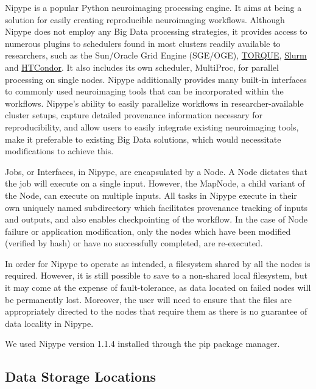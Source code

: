 \documentclass{IEEEtran}
\begin{document}
Nipype is a popular Python neuroimaging processing engine. It aims at being a 
solution for easily creating reproducible neuroimaging workflows. Although Nipype
does not employ any Big Data processing strategies, it provides access to numerous
plugins to schedulers found in most clusters readily available to researchers, 
such as the Sun/Oracle Grid Engine (SGE/OGE), \href{http://www.adaptivecomputing.com/products/torque/}{TORQUE},
\href{https://slurm.schedmd.com/}{Slurm} and \href{https://research.cs.wisc.edu/htcondor/}{HTCondor}. It also includes its own scheduler, MultiProc,
for parallel processing on single nodes. Nipype additionally provides many built-in 
interfaces to commonly used neuroimaging tools that can be incorporated within the 
workflows. Nipype's ability to easily parallelize workflows in researcher-available 
cluster setups, capture detailed provenance information necessary for reproducibility,
and allow users to easily integrate existing neuroimaging tools, make it preferable
to existing Big Data solutions, which would necessitate modifications to achieve this.

Jobs, or Interfaces, in Nipype, are encapsulated by a Node. A Node dictates that
the job will execute on a single input. However, the MapNode, 
a child variant of the Node, can execute on multiple inputs. All tasks in
Nipype execute in their own uniquely named subdirectory which facilitates provenance 
tracking of inputs and outputs, and also enables checkpointing of the workflow.
In the case of Node failure or application modification, only the nodes which have
been modified (verified by hash) or have no successfully completed, are re-executed.

In order for Nipype to operate as intended, a filesystem shared by all the nodes 
is required. However, it is still possible to save to a non-shared 
local filesystem, but it may come at the expense of fault-tolerance, as data 
located on failed nodes will be permanently lost. Moreover, the 
user will need to ensure that the files are appropriately directed to 
the nodes that require them as there is no guarantee of data locality 
in Nipype.

We used Nipype version 1.1.4 installed through the pip package manager.

\subsection{Data Storage Locations}
\end{document}
